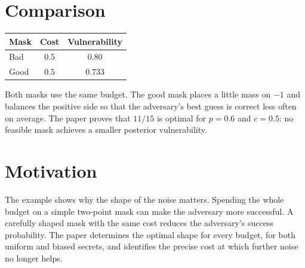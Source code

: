 \documentclass{article}
\begin{document}
\section{Comparison}
\begin{center}
\begin{tabular}{l|c|c}
Mask & Cost & Vulnerability\\
\hline
Bad & \(0.5\) & \(0.80\)\\
Good & \(0.5\) & \(0.733\)
\end{tabular}
\end{center}
Both masks use the same budget. The good mask places a little mass on \(-1\) and balances the positive side so that the adversary's best guess is correct less often on average. The paper proves that \(11/15\) is optimal for \(p=0.6\) and \(c=0.5\): no feasible mask achieves a smaller posterior vulnerability.

\section{Motivation}
The example shows why the shape of the noise matters. Spending the whole budget on a simple two-point mask can make the adversary more successful. A carefully shaped mask with the same cost reduces the adversary's success probability. The paper determines the optimal shape for every budget, for both uniform and biased secrets, and identifies the precise cost at which further noise no longer helps.
\end{document}
